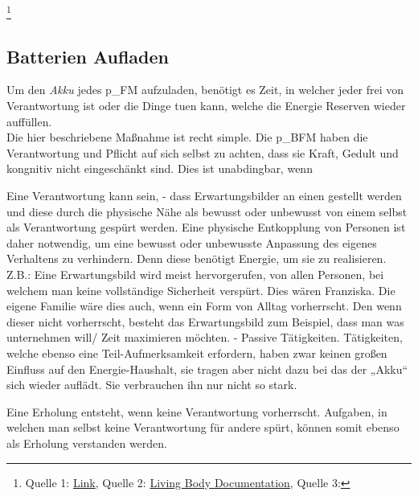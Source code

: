 \footnote{
	Quelle 1: \href{https://www.ipzf.de/gehirnentwicklung.html}{Link},
	Quelle 2: \href{https://www.youtube.com/watch?v=ZNYv_ory8rc}{Living Body Documentation},
	Quelle 3: %
}






\subsection{Batterien Aufladen}

Um den \textit{Akku} jedes \gls{p_FM} aufzuladen, benötigt es Zeit, in welcher jeder frei von Verantwortung ist oder die Dinge tuen kann, welche die Energie Reserven wieder auffüllen.\\

Die hier beschriebene Maßnahme ist recht simple. Die \gls{p_BFM} haben die Verantwortung und Pflicht auf sich selbst zu achten, dass sie Kraft, Gedult und kongnitiv nicht eingeschänkt sind. Dies ist unabdingbar, wenn 

Eine Verantwortung kann sein, 
- dass Erwartungsbilder an einen gestellt werden und diese durch die physische Nähe als bewusst oder unbewusst von einem selbst als Verantwortung gespürt werden. Eine physische Entkopplung von Personen ist daher notwendig, um eine bewusst oder unbewusste Anpassung des eigenes Verhaltens zu verhindern. Denn diese benötigt Energie, um sie zu realisieren. Z.B.: Eine Erwartungsbild wird meist hervorgerufen, von allen Personen, bei welchem man keine vollständige Sicherheit verspürt. Dies wären Franziska. Die eigene Familie wäre dies auch, wenn ein Form von Alltag vorherrscht. Den wenn dieser nicht vorherrscht, besteht das Erwartungsbild zum Beispiel, dass man was unternehmen will/ Zeit maximieren möchten.
- Passive Tätigkeiten. Tätigkeiten, welche ebenso eine Teil-Aufmerksamkeit erfordern, haben zwar keinen großen Einfluss auf den Energie-Haushalt, sie tragen aber nicht dazu bei das der „Akku“ sich wieder auflädt. Sie verbrauchen ihn nur nicht so stark.

Eine Erholung entsteht, wenn keine Verantwortung vorherrscht. Aufgaben, in welchen man selbst keine Verantwortung für andere spürt, können somit ebenso als Erholung verstanden werden. 

